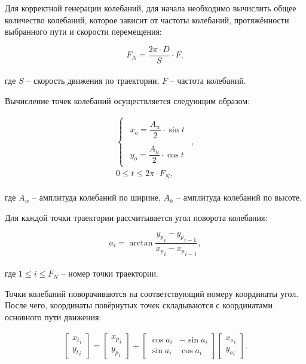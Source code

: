 Для корректной генерации колебаний, для начала необходимо вычислить общее количество колебаний, которое зависит от частоты колебаний, протяжённости выбранного пути и скорости перемещения:

\begin{equation*}
    F_N = \dfrac{2 \pi \cdot D}{S} \cdot F,
\end{equation*} \\
где $S$ -- скорость движения по траектории, $F$ -- частота колебаний.

Вычисление точек колебаний осуществляется следующим образом:

\begin{gather}
    \begin{cases}
        \label{eq:OscillationCircle}
        \begin{aligned}
            x_o = \dfrac{A_w}{2} \cdot \sin t \\
            \\
            y_o = \dfrac{A_h}{2} \cdot \cos t
        \end{aligned}
    \end{cases}, \\
    \nonumber
    0 \leq t \leq 2 \pi \cdot F_N,
\end{gather} \\
где $A_w$ -- амплитуда колебаний по ширине, $A_h$ -- амплитуда колебаний по высоте.

Для каждой точки траектории рассчитывается угол поворота колебания:

\begin{equation*}
    a_i = \arctan \dfrac{{y_p}_i - {y_p}_{i-1}}{{x_p}_i - {x_p}_{i-1}},
\end{equation*} \\
где $1 \leq i \leq F_N$ -- номер точки траектории.

Точки колебаний поворачиваются на соответствующий номеру координаты угол.
После чего, координаты повёрнутых точек складываются с координатами основного пути движения:

\begin{gather*}
    \begin{bmatrix}
    {x_t}
        _i \\
        {y_t}_i
    \end{bmatrix} =
    \begin{bmatrix}
    {x_p}
        _i \\
        {y_p}_i
    \end{bmatrix} +
    \begin{bmatrix}
        \cos a_i & - \sin a_i \\
        \sin a_i & \cos a_i
    \end{bmatrix}
    \begin{bmatrix}
    {x_o}
        _i \\
        {y_o}_i
    \end{bmatrix}.
\end{gather*} \\


